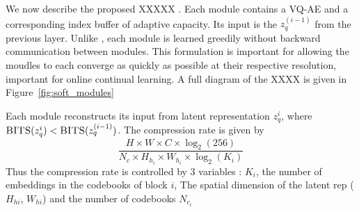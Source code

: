 \documentclass[colorinlistoftodos]{article} %
\begin{document}
We now describe the proposed XXXXX . Each module contains a VQ-AE and a corresponding index buffer of adaptive capacity. Its input is the $z_q^{(i-1)}$ from the previous layer. Unlike \cite{}, each module is learned greedily without backward communication between modules. This formulation is important for allowing the moudles to each converge as quickly as possible at their respective resolution, important for online continual learning.  A full diagram of the XXXX is given in Figure~\ref{fig:soft_modules}

Each module reconstructs its input from latent representation $z_q^{i}$, where $\textsc{BITS}(z_q^{i}) < \textsc{BITS}(z_q^{(i-1)})$. The compression rate is given by
    $$
        \frac{H \times W \times C \times  \log_2{(256)}}
             {N_c \times H_h_i \times W_h_i \times \log_2{(K_i)}}
    $$
    Thus the compression rate is controlled by 3 variables : $K_i$, the number of embeddings in the codebooks of block $i$, The spatial dimension of the latent rep ($H_{hi}$, $W_{hi}$) and the number of codebooks $N_c_i$ 
\end{document}
